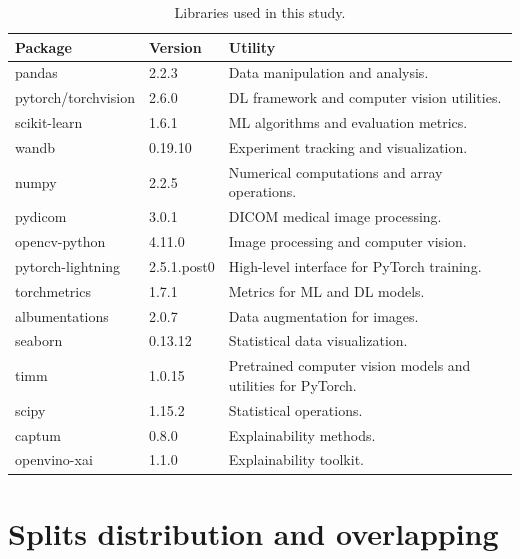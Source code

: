 \documentclass[a4paper,10pt]{book}
\begin{document}
\begin{table}[h!]
    \caption[Libraries]{Libraries used in this study.}
    \centering
    \begin{tabular}{l l p{7cm}}
        \toprule
        \textbf{Package} & \textbf{Version} & \textbf{Utility} \\
        \midrule
        pandas \cite{PythonDataAnalysis} & 2.2.3 & Data manipulation and analysis. \\
        pytorch/torchvision \cite{PyTorch} & 2.6.0 & DL framework and computer vision utilities. \\
        scikit-learn \cite{ScikitlearnMachineLearning} & 1.6.1 & ML algorithms and evaluation metrics. \\
        wandb \cite{WeightsBiasesAI} & 0.19.10 & Experiment tracking and visualization. \\
        numpy \cite{NumPy} & 2.2.5 & Numerical computations and array operations. \\
        pydicom \cite{Pydicom} & 3.0.1 & DICOM medical image processing. \\
        opencv-python \cite{OpenCV} & 4.11.0 & Image processing and computer vision. \\
        pytorch-lightning \cite{PyTorchLightning} & 2.5.1.post0 & High-level interface for PyTorch training. \\
        torchmetrics \cite{TorchMetrics} & 1.7.1 & Metrics for ML and DL models. \\
        albumentations \cite{AlbumentationsFastFlexible} & 2.0.7 & Data augmentation for images. \\
        seaborn \cite{waskomSeabornStatisticalData2021} & 0.13.12 & Statistical data visualization. \\
        timm \cite{TimmPyTorchImage2025} & 1.0.15 & Pretrained computer vision models and utilities for PyTorch. \\
        scipy \cite{noauthor_scipy_nodate} & 1.15.2 & Statistical operations. \\
        captum \cite{noauthor_captum_nodate} & 0.8.0 & Explainability methods. \\
        openvino-xai \cite{noauthor_welcome_nodate} & 1.1.0 & Explainability toolkit. \\
        \bottomrule
    \end{tabular}
    \label{tab:libraries}
\end{table}


\chapter{Splits  distribution and overlapping}
\end{document}
